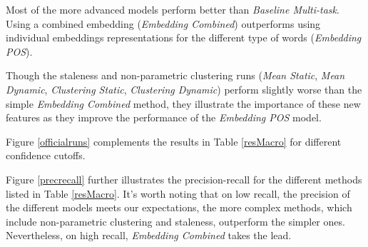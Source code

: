 \documentclass{article}
\begin{document}
{{Most of the more advanced models perform better than {\textit{Baseline Multi-task}}. Using a combined embedding ({\textit{Embedding Combined}}) outperforms using individual embeddings representations for the different type of words ({\textit{Embedding POS}}).

Though the staleness and non-parametric clustering runs ({\textit{Mean Static}}, {\textit{Mean Dynamic}}, {\textit{Clustering Static}}, {\textit{Clustering Dynamic}}) perform slightly worse than the simple {\textit{Embedding Combined}} method, they illustrate the importance of these new features as they improve the performance of the {\textit{Embedding POS}} model.

Figure \ref{officialruns} complements the results in Table \ref{resMacro} for different confidence cutoffs. 

Figure \ref{precrecall} further illustrates the precision-recall for the different methods listed in Table \ref{resMacro}. It's worth noting that on low recall, the precision of the different models meets our expectations, the more complex methods, which include non-parametric clustering and staleness, outperform the simpler ones. Nevertheless, on high recall, {\textit{Embedding Combined}} takes the lead.


}}
\end{document}

